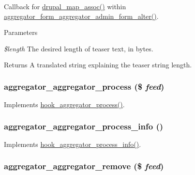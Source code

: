 Callback for \hyperlink{common_8inc_a72b55fe42aa726cc506660138abd3307}{drupal\_\-map\_\-assoc()} within \hyperlink{aggregator_8processor_8inc_afe5142db83732a99329131faa707c216}{aggregator\_\-form\_\-aggregator\_\-admin\_\-form\_\-alter()}.


\begin{DoxyParams}{Parameters}
\item[{\em \$length}]The desired length of teaser text, in bytes.\end{DoxyParams}
\begin{DoxyReturn}{Returns}
A translated string explaining the teaser string length. 
\end{DoxyReturn}
\hypertarget{aggregator_8processor_8inc_ac8c315c9888cf5cd17b1a119105b889b}{
\subsubsection[{aggregator\_\-aggregator\_\-process}]{\setlength{\rightskip}{0pt plus 5cm}aggregator\_\-aggregator\_\-process (\$ {\em feed})}}
\label{aggregator_8processor_8inc_ac8c315c9888cf5cd17b1a119105b889b}
Implements \hyperlink{group__hooks_gaf5da0f420ab3b27c1bc33f339c979ac7}{hook\_\-aggregator\_\-process()}. \hypertarget{aggregator_8processor_8inc_a7543703bc5549f0f99f5daa9d1671a49}{
\subsubsection[{aggregator\_\-aggregator\_\-process\_\-info}]{\setlength{\rightskip}{0pt plus 5cm}aggregator\_\-aggregator\_\-process\_\-info ()}}
\label{aggregator_8processor_8inc_a7543703bc5549f0f99f5daa9d1671a49}
Implements \hyperlink{group__hooks_gae616ac385e5ff114031dc2dc88413e32}{hook\_\-aggregator\_\-process\_\-info()}. \hypertarget{aggregator_8processor_8inc_a6e778e5eb28b433bc6f2cf8899984117}{
\subsubsection[{aggregator\_\-aggregator\_\-remove}]{\setlength{\rightskip}{0pt plus 5cm}aggregator\_\-aggregator\_\-remove (\$ {\em feed})}}
